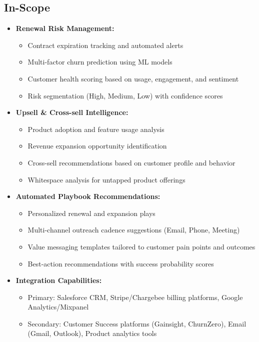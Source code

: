 \documentclass[12pt,a4paper]{article}
\begin{document}
\subsection{In-Scope}
\begin{itemize}
    \item \textbf{Renewal Risk Management:}
    \begin{itemize}
        \item Contract expiration tracking and automated alerts
        \item Multi-factor churn prediction using ML models
        \item Customer health scoring based on usage, engagement, and sentiment
        \item Risk segmentation (High, Medium, Low) with confidence scores
    \end{itemize}
    \item \textbf{Upsell \& Cross-sell Intelligence:}
    \begin{itemize}
        \item Product adoption and feature usage analysis
        \item Revenue expansion opportunity identification
        \item Cross-sell recommendations based on customer profile and behavior
        \item Whitespace analysis for untapped product offerings
    \end{itemize}
    \item \textbf{Automated Playbook Recommendations:}
    \begin{itemize}
        \item Personalized renewal and expansion plays
        \item Multi-channel outreach cadence suggestions (Email, Phone, Meeting)
        \item Value messaging templates tailored to customer pain points and outcomes
        \item Best-action recommendations with success probability scores
    \end{itemize}
    \item \textbf{Integration Capabilities:}
    \begin{itemize}
        \item Primary: Salesforce CRM, Stripe/Chargebee billing platforms, Google Analytics/Mixpanel
        \item Secondary: Customer Success platforms (Gainsight, ChurnZero), Email (Gmail, Outlook), Product analytics tools

\end{itemize}
\end{itemize}
\end{document}
